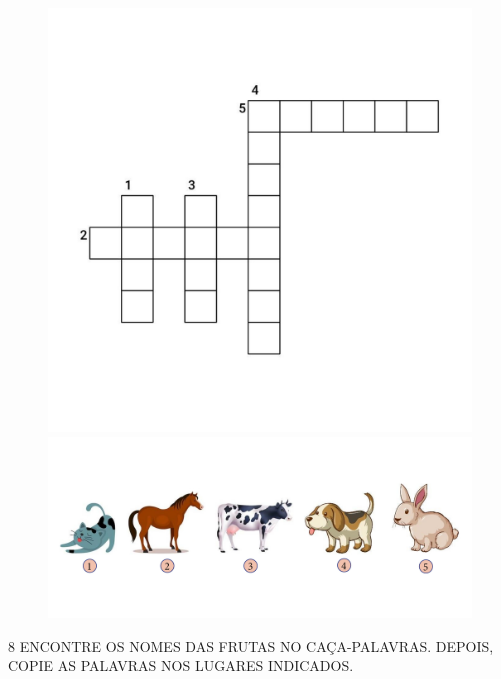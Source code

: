 \begin{figure}[H]
\centering
\includegraphics[width=\textwidth]{media/image90.png}

\includegraphics[width=.8\textwidth]{media/image90b.png}
\end{figure}


\pagebreak
\num{8} ENCONTRE OS NOMES DAS FRUTAS NO CAÇA-PALAVRAS. DEPOIS, COPIE AS PALAVRAS NOS LUGARES INDICADOS.


